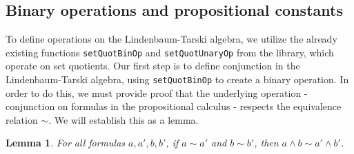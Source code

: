 \documentclass[titlepage]{article}
\newtheorem{lemma}{Lemma}[section]
\begin{document}


\subsection{Binary operations and propositional constants}

To define operations on the Lindenbaum-Tarski algebra, we utilize the already existing functions \texttt{setQuotBinOp} and \texttt{setQuotUnaryOp} from the \agdaCubical library, which operate on set quotients. Our first step is to define conjunction in the Lindenbaum-Tarski algebra, using \texttt{setQuotBinOp} to create a binary operation. In order to do this, we must provide proof that the underlying operation - conjunction on formulas in the propositional calculus - respects the equivalence relation $\sim$. We will establish this as a lemma.

\begin{lemma}
    For all formulas $a,a',b,b'$, if $a\sim a'$ and $b \sim b'$, then $a\wedge b \sim a' \wedge b'$.
\end{lemma}
\end{document}
